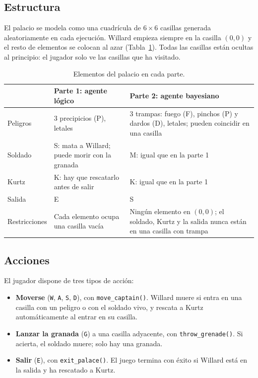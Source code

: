 \documentclass[11pt,a4paper]{article}
\newcommand{\code}[1]{\texttt{#1}}
\begin{document}
\subsection{Estructura}
El palacio se modela como una cuadrícula de $6\times6$ casillas generada aleatoriamente en cada ejecución. Willard empieza siempre en la casilla $(0,0)$ y el resto de elementos se colocan al azar (Tabla~\ref{tab:elementos}). Todas las casillas están ocultas al principio: el jugador solo ve las casillas que ha visitado.

\begin{table}[H]
\centering\small
\caption{Elementos del palacio en cada parte.}\label{tab:elementos}
\begin{tabularx}{\linewidth}{@{}lXX@{}}
\toprule
 & \textbf{Parte 1: agente lógico} & \textbf{Parte 2: agente bayesiano}\\
\midrule
Peligros & 3 precipicios (P), letales & 3 trampas: fuego (F), pinchos (P) y dardos (D), letales; pueden coincidir en una casilla\\
Soldado & S: mata a Willard; puede morir con la granada & M: igual que en la parte 1\\
Kurtz & K: hay que rescatarlo antes de salir & K: igual que en la parte 1\\
Salida & E & S\\
Restricciones & Cada elemento ocupa una casilla vacía & Ningún elemento en $(0,0)$; el soldado, Kurtz y la salida nunca están en una casilla con trampa\\
\bottomrule
\end{tabularx}
\end{table}

\subsection{Acciones}
El jugador dispone de tres tipos de acción:
\begin{itemize}
\item \textbf{Moverse} (\code{W}, \code{A}, \code{S}, \code{D}), con \code{move\_captain()}. Willard muere si entra en una casilla con un peligro o con el soldado vivo, y rescata a Kurtz automáticamente al entrar en su casilla.
\item \textbf{Lanzar la granada} (\code{G}) a una casilla adyacente, con \code{throw\_grenade()}. Si acierta, el soldado muere; solo hay una granada.
\item \textbf{Salir} (\code{E}), con \code{exit\_palace()}. El juego termina con éxito si Willard está en la salida y ha rescatado a Kurtz.
\end{itemize}
\end{document}
